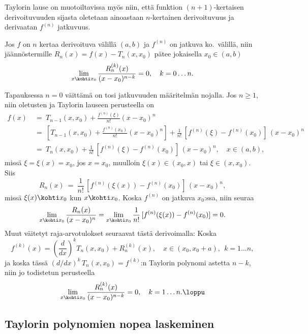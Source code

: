 Taylorin lause on muotoiltavissa myös niin, että funktion $(n+1)$-kertaisen derivoituvuuden
sijasta oletetaan ainoastaan $n$-kertainen derivoituvuus ja derivaatan $f^{(n)}$ jatkuvuus.
\begin{Lause} \label{Taylorin approksimaatiolause} Jos $f$ on $n$ kertaa derivoituva välillä
$(a,b)$ ja $f^{(n)}$ on jatkuva ko.\ välillä, niin jäännöstermille $R_n(x)=f(x)-T_n(x,x_0)$
pätee jokaisella $x_0\in(a,b)$
\[
\lim_{x \kohti x_0} \frac{R_n^{(k)}(x)}{(x-x_0)^{n-k}} = 0, \quad k = 0 \ldots n.
\]
\end{Lause}
\tod Tapauksessa $n=0$ väittämä on tosi jatkuvuuden määritelmän nojalla. Jos $n \ge 1$, niin 
oletusten ja Taylorin lauseen perusteella on
\begin{align*}
f(x)\ &=\ T_{n-1}(x,x_0) + \frac{f^{(n)}(\xi)}{n!}(x-x_0)^n \\
      &=\ \left[T_{n-1}(x,x_0) + \frac{f^{(n)}(x_0)}{n!}(x-x_0)^n\right] 
                               + \frac{1}{n!}\,[f^{(n)}(\xi)-f^{(n)}(x_0)]\,(x-x_0)^n \\
      &=\ T_n(x,x_0) + \frac{1}{n!}\,[f^{(n)}(\xi)-f^{(n)}(x_0)]\,(x-x_0)^n, \quad x\in(a,b),
\end{align*} 
missä $\xi=\xi(x)=x_0$, jos $x=x_0$, muulloin $\xi(x)\in(x_0,x)$ tai $\xi\in(x,x_0)$. Siis
\[
R_n(x)\ =\  \frac{1}{n!}\,[f^{(n)}(\xi(x))-f^{(n)}(x_0)]\,(x-x_0)^n,
\]
missä $\xi(x) \kohti x_0$ kun $x \kohti x_0$. Koska $f^{(n)}$ on jatkuva $x_0$:ssa, niin
seuraa
 \[
\lim_{x \kohti x_0} \frac{R_n(x)}{(x-x_0)^n} 
              = \lim_{x \kohti x_0} \frac{1}{n!}\,[f^{(n)}(\xi(x))-f^{(n)}(x_0)] = 0.
\]
Muut väitetyt raja-arvotulokset seuraavat tästä derivoimalla: Koska
\[
f^{(k)}(x) = \left(\frac{d}{dx}\right)^k T_n(x,x_0) + R_n^{(k)}(x), \quad 
                                  x \in (x_0,x_0+a),\ \ k=1 \ldots n,
\]
ja koska tässä $(d/dx)^k\,T_n(x,x_0) = f^{(k)}$:n Taylorin polynomi astetta $n-k$, niin jo 
todistetun perusteella
\[
\lim_{x \kohti x_0} \frac{R_n^{(k)}(x)}{(x-x_0)^{n-k}} = 0, \quad k=1 \ldots n. \loppu
\]

\subsection*{Taylorin polynomien nopea laskeminen}

